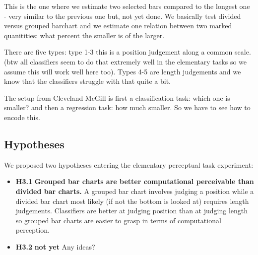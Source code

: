 \documentclass[journal]{vgtc}                %
\begin{document}
This is the one where we estimate two selected bars compared to the longest one - very similar to the previous one but, not yet done. We basically test divided versus grouped barchart and we estimate one relation between two marked quanitities: what percent the smaller is of the larger.

There are five types: type 1-3 this is a position judgement along a common scale. (btw all classifiers seem to do that extremely well in the elementary tasks so we assume this will work well here too). Types 4-5 are length judgements and we know that the classifiers struggle with that quite a bit.

The setup from Cleveland McGill is first a classification task: which one is smaller? and then a regression task: how much smaller. So we have to see how to encode this.


\subsection{Hypotheses}

We proposed two hypotheses entering the elementary perceptual task experiment:

\begin{itemize}
	\item \textbf{H3.1} \textbf{Grouped bar charts are better computational perceivable than divided bar charts.} A grouped bar chart involves judging a position while a divided bar chart most likely (if not the bottom is looked at) requires length judgements. Classifiers are better at judging position than at judging length so grouped bar charts are easier to grasp in terms of computational perception.
	\item \textbf{H3.2} \textbf{not yet} Any ideas?
\end{itemize}
\end{document}
